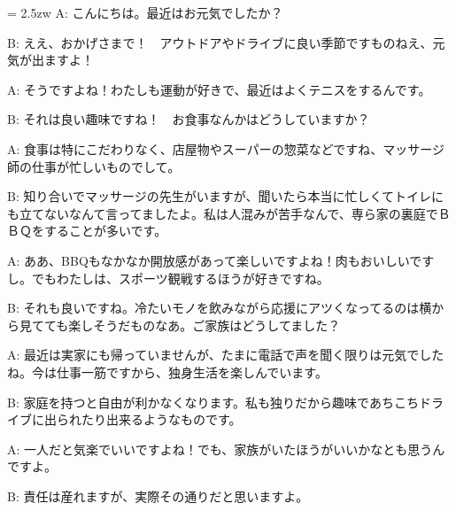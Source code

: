 \documentclass[11pt]{amsart}
\title{}
\author{}
\newenvironment{hangall}[1]{\hangindent = 2.5zw\everypar{\hangindent = 2.5zw}}{}
\begin{document}
\maketitle
\begin{hangall}{}%
A: こんにちは。最近はお元気でしたか？

B: ええ、おかげさまで！　アウトドアやドライブに良い季節ですものねえ、元気が出ますよ！

A: そうですよね！わたしも運動が好きで、最近はよくテニスをするんです。

B: それは良い趣味ですね！　お食事なんかはどうしていますか？

A: 食事は特にこだわりなく、店屋物やスーパーの惣菜などですね、マッサージ師の仕事が忙しいものでして。

B: 知り合いでマッサージの先生がいますが、聞いたら本当に忙しくてトイレにも立てないなんて言ってましたよ。私は人混みが苦手なんで、専ら家の裏庭でＢＢＱをすることが多いです。

A: ああ、BBQもなかなか開放感があって楽しいですよね！肉もおいしいですし。でもわたしは、スポーツ観戦するほうが好きですね。

B: それも良いですね。冷たいモノを飲みながら応援にアツくなってるのは横から見てても楽しそうだものなあ。ご家族はどうしてました？

A: 最近は実家にも帰っていませんが、たまに電話で声を聞く限りは元気でしたね。今は仕事一筋ですから、独身生活を楽しんでいます。

B: 家庭を持つと自由が利かなくなります。私も独りだから趣味であちこちドライブに出られたり出来るようなものです。

A: 一人だと気楽でいいですよね！でも、家族がいたほうがいいかなとも思うんですよ。

B: 責任は産れますが、実際その通りだと思いますよ。
\end{hangall}
\end{document}

